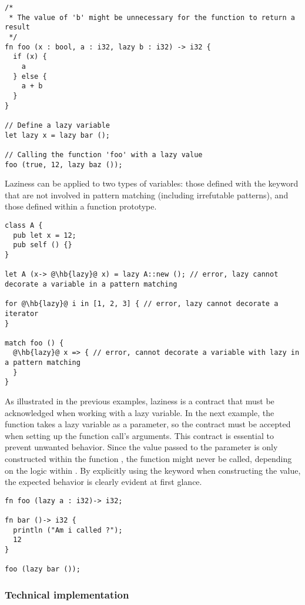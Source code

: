\begin{lstlisting}[style=coloredverbatim]
/*
 * The value of 'b' might be unnecessary for the function to return a result
 */
fn foo (x : bool, a : i32, lazy b : i32) -> i32 {
  if (x) {
    a
  } else {
    a + b
  }
}

// Define a lazy variable
let lazy x = lazy bar ();

// Calling the function 'foo' with a lazy value
foo (true, 12, lazy baz ());
\end{lstlisting}

Laziness can be applied to two types of variables: those defined with the
 keyword that are not involved in pattern matching (including
irrefutable patterns), and those defined within a function prototype.

\begin{lstlisting}[style=coloredverbatim, escapechar=@]
class A {
  pub let x = 12;
  pub self () {}
}

let A (x-> @\hb{lazy}@ x) = lazy A::new (); // error, lazy cannot decorate a variable in a pattern matching

for @\hb{lazy}@ i in [1, 2, 3] { // error, lazy cannot decorate a iterator
}

match foo () {
  @\hb{lazy}@ x => { // error, cannot decorate a variable with lazy in a pattern matching
  }
}
\end{lstlisting}

As illustrated in the previous examples, laziness is a contract that must be
acknowledged when working with a lazy variable. In the next example, the
function  takes a lazy variable as a parameter, so the contract must
be accepted when setting up the function call's arguments. This contract is
essential to prevent unwanted behavior. Since the value passed to the parameter
 is only constructed within the function , the function
 might never be called, depending on the logic within . By
explicitly using the  keyword when constructing the value, the
expected behavior is clearly evident at first glance.

\begin{lstlisting}[style=coloredverbatim]
fn foo (lazy a : i32)-> i32;

fn bar ()-> i32 {
  println ("Am i called ?");
  12
}

foo (lazy bar ());
\end{lstlisting}

\subsubsection*{Technical implementation}

